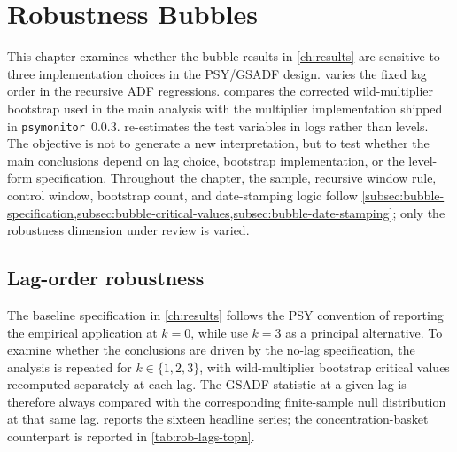 \chapter{Robustness Bubbles}
\label{ch:robustness}

This chapter examines whether the bubble results in \cref{ch:results} are sensitive to three implementation choices in the PSY/GSADF design.  varies the fixed lag order in the recursive ADF regressions.  compares the corrected wild-multiplier bootstrap used in the main analysis with the multiplier implementation shipped in \texttt{psymonitor}~0.0.3.  re-estimates the test variables in logs rather than levels. The objective is not to generate a new interpretation, but to test whether the main conclusions depend on lag choice, bootstrap implementation, or the level-form specification. Throughout the chapter, the sample, recursive window rule, control window, bootstrap count, and date-stamping logic follow \cref{subsec:bubble-specification,subsec:bubble-critical-values,subsec:bubble-date-stamping}; only the robustness dimension under review is varied.


\section{Lag-order robustness}
\label{sec:rob-lags}

The baseline specification in \cref{ch:results} follows the PSY convention of reporting the empirical application at $k=0$, while \citet[footnote~22]{phillipsShiYu2015a} use $k=3$ as a principal alternative. To examine whether the conclusions are driven by the no-lag specification, the analysis is repeated for $k\in\{1,2,3\}$, with wild-multiplier bootstrap critical values recomputed separately at each lag. The GSADF statistic at a given lag is therefore always compared with the corresponding finite-sample null distribution at that same lag.  reports the sixteen headline series; the concentration-basket counterpart is reported in \cref{tab:rob-lags-topn}.


